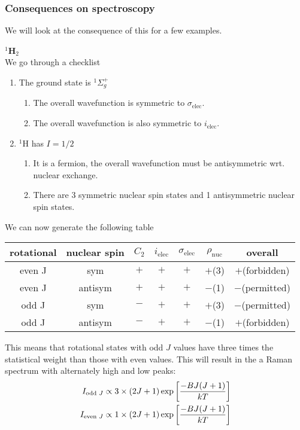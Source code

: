\subsubsection{Consequences on spectroscopy}
\label{nucspinspec}
We will look at the consequence of this for a few examples.\par
\textbf{$^1$H$_2$}\\
We go through a checklist
\begin{enumerate}
  \item The ground state is $^1\Sigma_g^+$
  \begin{enumerate}
  \item The overall wavefunction is symmetric to $\sigma_{\text{elec}}$.
  \item The overall wavefunction is also symmetric to $i_{\text{elec}}$.
\end{enumerate}
  \item $^1$H has $I=1/2$
\begin{enumerate}
  \item It is a fermion, the overall wavefunction must be antisymmetric wrt. nuclear exchange.
  \item There are 3 symmetric nuclear spin states and 1 antisymmetric nuclear spin states.
\end{enumerate}
\end{enumerate}
We can now generate the following table
\begin{center}
\begin{tabular}{cc|cccc|c}
\hline
rotational & nuclear spin & $C_2$ & $i_{\text{elec}}$ & $\sigma_{\text{elec}}$ & $\rho_{\text{nuc}}$ & overall\\
\hline
even J & sym & $+$ & $+$ & $+$ & $+$(3) & $+$(forbidden)\\
even J & antisym & $+$ & $+$ & $+$ & $-$(1) & $-$(permitted)\\
odd J & sym & $-$ & $+$ & $+$ & $+$(3) & $-$(permitted)\\
odd J & antisym & $-$ & $+$ & $+$ & $-$(1) & $+$(forbidden)\\
\hline
\end{tabular}
\end{center}
This means that rotational states with odd $J$ values have three times the statistical weight than those with even values. This will result in the a Raman spectrum with alternately high and low peaks: 
\begin{equation}
\begin{aligned}
I_{\text{odd }J}&\propto 3\times(2J+1)\exp\left[\frac{-BJ(J+1)}{kT} \right]\\
I_{\text{even }J}&\propto 1\times(2J+1)\exp\left[\frac{-BJ(J+1)}{kT} \right]
\end{aligned}
\end{equation}
